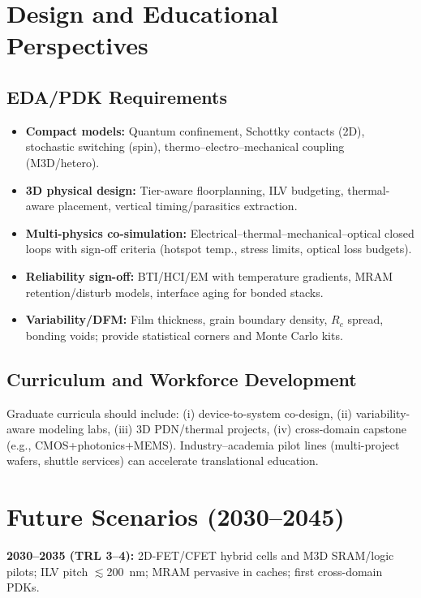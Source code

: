 \documentclass[conference]{IEEEtran}
\begin{document}
\section{Design and Educational Perspectives}

\subsection{EDA/PDK Requirements}
\begin{itemize}
  \item \textbf{Compact models:} Quantum confinement, Schottky contacts (2D), stochastic switching (spin), thermo–electro–mechanical coupling (M3D/hetero).
  \item \textbf{3D physical design:} Tier-aware floorplanning, ILV budgeting, thermal-aware placement, vertical timing/parasitics extraction.
  \item \textbf{Multi-physics co-simulation:} Electrical–thermal–mechanical–optical closed loops with sign-off criteria (hotspot temp., stress limits, optical loss budgets).
  \item \textbf{Reliability sign-off:} BTI/HCI/EM with temperature gradients, MRAM retention/disturb models, interface aging for bonded stacks.
  \item \textbf{Variability/DFM:} Film thickness, grain boundary density, $R_c$ spread, bonding voids; provide statistical corners and Monte Carlo kits.
\end{itemize}

\subsection{Curriculum and Workforce Development}
Graduate curricula should include: (i) device-to-system co-design, (ii) variability-aware modeling labs, (iii) 3D PDN/thermal projects, (iv) cross-domain capstone (e.g., CMOS+photonics+MEMS).
Industry–academia pilot lines (multi-project wafers, shuttle services) can accelerate translational education.

\section{Future Scenarios (2030--2045)}

\noindent\textbf{2030--2035 (TRL 3--4):}
2D-FET/CFET hybrid cells and M3D SRAM/logic pilots; ILV pitch \(\lesssim\)\SI{200}{nm}; MRAM pervasive in caches; first cross-domain PDKs.
\end{document}
